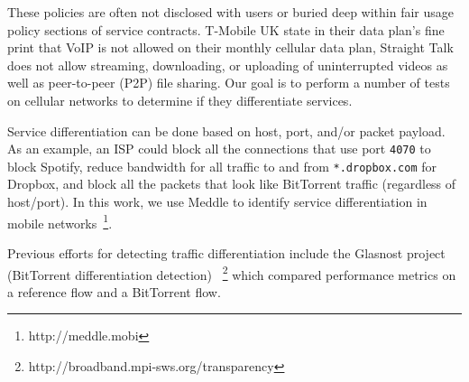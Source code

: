\documentclass[letterpaper]{sig-alternate-10pt}
\begin{document}
These policies are often not disclosed with users or buried deep within fair usage policy sections of service contracts. T-Mobile UK state in their data plan's fine print that VoIP is not allowed on their monthly cellular data plan, Straight Talk does not allow streaming, downloading, or uploading of uninterrupted videos as well as peer-to-peer (P2P) file sharing. Our goal is to perform a number of tests on cellular networks to determine if they differentiate services.

Service differentiation can be done based on host, port, and/or packet payload. As an example, an ISP could block all the connections that use port \texttt{4070} to block Spotify, reduce bandwidth for all traffic to and from \texttt{*.dropbox.com} for Dropbox, and block all the packets that look like BitTorrent traffic (regardless of host/port). In this work, we use Meddle to identify service differentiation in mobile networks~\footnote{http://meddle.mobi}.

Previous efforts for detecting traffic differentiation include the Glasnost project (BitTorrent differentiation detection) ~\footnote{http://broadband.mpi-sws.org/transparency} which compared performance metrics on a reference flow and a BitTorrent flow.

%


\end{document}
